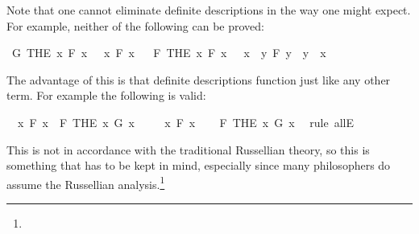 \begin{isabellebody}
%
\endisadelimproof
%
\begin{isamarkuptext}%
Note that one cannot eliminate definite descriptions in the way one might expect. For example,
neither of the following can be proved:%
\end{isamarkuptext}\isamarkuptrue%
\isamarkupfalse%
\ {\isachardoublequoteopen}G\ {\isacharparenleft}THE\ x{\isachardot}\ F\ x{\isacharparenright}\ {\isasymlongrightarrow}\ {\isacharparenleft}{\isasymexists}\ x{\isachardot}\ F\ x{\isacharparenright}{\isachardoublequoteclose}%
\isadelimproof
\ %
\endisadelimproof
%
\isatagproof
{}\isamarkupfalse%
%
\endisatagproof
{\isafoldproof}%
%
\isadelimproof
%
\endisadelimproof
\isanewline
{}\isamarkupfalse%
\ {\isachardoublequoteopen}F\ {\isacharparenleft}THE\ x{\isachardot}\ F\ x{\isacharparenright}\ {\isasymlongrightarrow}\ {\isacharparenleft}{\isasymexists}\ x{\isachardot}\ {\isasymforall}\ y{\isachardot}\ F\ y\ {\isasymlongrightarrow}\ y\ {\isacharequal}\ x{\isacharparenright}{\isachardoublequoteclose}%
\isadelimproof
\ %
\endisadelimproof
%
\isatagproof
{}\isamarkupfalse%
%
\endisatagproof
{\isafoldproof}%
%
\isadelimproof
%
\endisadelimproof
%
\begin{isamarkuptext}%
The advantage of this is that definite descriptions function just like any other term. For
example the following is valid:%
\end{isamarkuptext}\isamarkuptrue%
\isamarkupfalse%
\ {\isachardoublequoteopen}{\isacharparenleft}{\isasymforall}\ x{\isachardot}\ F\ x{\isacharparenright}\ {\isasymlongrightarrow}\ F\ {\isacharparenleft}THE\ x{\isachardot}\ G\ x{\isacharparenright}{\isachardoublequoteclose}\isanewline
%
\isadelimproof
%
\endisadelimproof
%
\isatagproof
{}\isamarkupfalse%
\isanewline
\ \ \isamarkupfalse%
\ {\isachardoublequoteopen}{\isasymforall}\ x{\isachardot}\ F\ x{\isachardoublequoteclose}\isanewline
\ \ \isamarkupfalse%
\ {\isachardoublequoteopen}F\ {\isacharparenleft}THE\ x{\isachardot}\ G\ x{\isacharparenright}{\isachardoublequoteclose}\ \isamarkupfalse%
\ {\isacharparenleft}rule\ allE{\isacharparenright}\isanewline
{}\isamarkupfalse%
%
\endisatagproof
{\isafoldproof}%
%
\isadelimproof
%
\endisadelimproof
%
\begin{isamarkuptext}%
This is not in accordance with the traditional Russellian theory, so this is something that
has to be kept in mind, especially since many philosophers do assume the Russellian analysis.\footnote{
}
\end{isamarkuptext}
\end{isabellebody}
